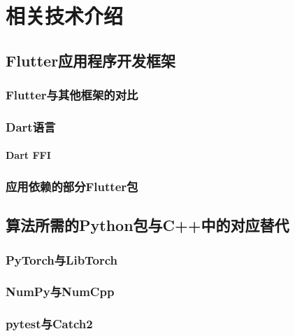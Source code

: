 \chapter{相关技术介绍}\label{ch:tech}


\section{Flutter应用程序开发框架}\label{sec:flutter}


\subsection{Flutter与其他框架的对比}\label{subsec:flutter-compare}


\subsection{Dart语言}\label{subsec:dart}



\subsubsection{Dart FFI}\label{subsubsec:ffi}


\subsection{应用依赖的部分Flutter包}\label{subsec:flutter-packages}



\section{算法所需的Python包与C++中的对应替代}\label{sec:python-cpp-packages}


\subsection{PyTorch与LibTorch}\label{subsec:pytorch-libtorch}


\subsection{NumPy与NumCpp}\label{subsec:numpy-numcpp}


\subsection{pytest与Catch2}\label{subsec:pytest-catch2}


